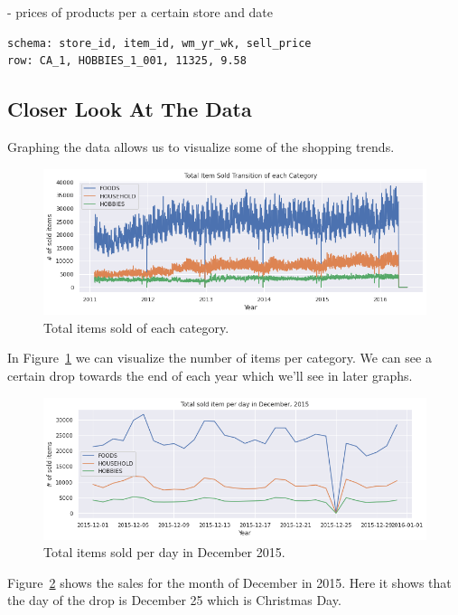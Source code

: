 \documentclass[10pt,twocolumn,letterpaper]{article}
\begin{document}
   - prices of products per a certain store and date

  {\scriptsize\begin{verbatim}
schema: store_id, item_id, wm_yr_wk, sell_price
row: CA_1, HOBBIES_1_001, 11325, 9.58
  \end{verbatim}}



\subsection{Closer Look At The Data}
  Graphing the data allows us to visualize some of the shopping trends.

\begin{figure}
  \begin{center}
    \includegraphics[width=0.7\linewidth]{img/totalItemSoldofEachCategory.png}
  \end{center}
  \caption{Total items sold of each category.\cite{ryuheeeei_2020}}
  \label{fig:totalItemSoldofEachCategory}
\end{figure}
  In Figure~\ref{fig:totalItemSoldofEachCategory} we can visualize the number of
  items per category. We can see a certain drop towards the end of each year
  which we'll see in later graphs.

\begin{figure}
  \begin{center}
    \includegraphics[width=0.7\linewidth]{img/totalSoldItemPerDayDec2015.png}
  \end{center}
    \caption{Total items sold per day in December 2015.\cite{ryuheeeei_2020}}
  \label{fig:totalSoldItemPerDayDec2015}
\end{figure}
  Figure~\ref{fig:totalSoldItemPerDayDec2015} shows the sales for the month of
  December in 2015. Here it shows that the day of the drop is December 25 which
  is Christmas Day.
\end{document}
